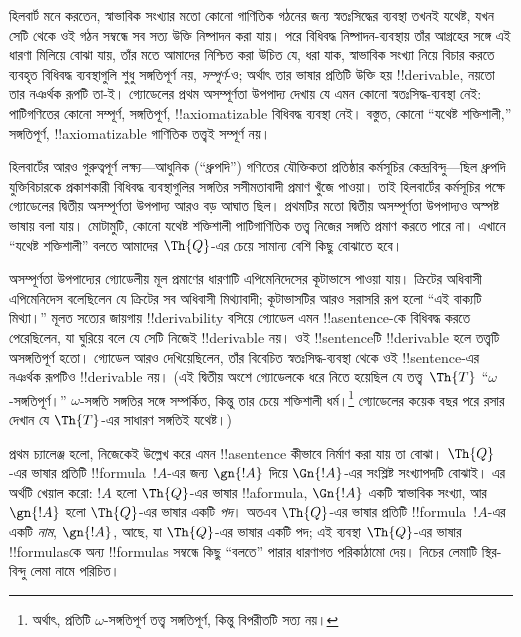 \documentclass[../../../include/open-logic-section]{subfiles}
\begin{document}


হিলবার্ট মনে করতেন, স্বাভাবিক সংখ্যার মতো কোনো গাণিতিক গঠনের জন্য
স্বতঃসিদ্ধের ব্যবস্থা তখনই যথেষ্ট, যখন সেটি থেকে ওই গঠন সম্বন্ধে সব সত্য
উক্তি নিষ্পাদন করা যায়। পরে বিধিবদ্ধ নিষ্পাদন-ব্যবস্থায় তাঁর আগ্রহের
সঙ্গে এই ধারণা মিলিয়ে বোঝা যায়, তাঁর মতে আমাদের নিশ্চিত করা উচিত যে,
ধরা যাক, স্বাভাবিক সংখ্যা নিয়ে বিচার করতে ব্যবহৃত বিধিবদ্ধ ব্যবস্থাগুলি
শুধু সঙ্গতিপূর্ণ নয়, \emph{সম্পূর্ণ}-ও; অর্থাৎ তার ভাষার প্রতিটি উক্তি
হয় !!{derivable}, নয়তো তার নঞর্থক রূপটি তা-ই। গ্যোডেলের প্রথম
অসম্পূর্ণতা উপপাদ্য দেখায় যে এমন কোনো স্বতঃসিদ্ধ-ব্যবস্থা নেই: পাটিগণিতের
কোনো সম্পূর্ণ, সঙ্গতিপূর্ণ, !!{axiomatizable} বিধিবদ্ধ ব্যবস্থা নেই। বস্তুত,
কোনো ``যথেষ্ট শক্তিশালী,'' সঙ্গতিপূর্ণ, !!{axiomatizable} গাণিতিক তত্ত্বই
সম্পূর্ণ নয়।

হিলবার্টের আরও গুরুত্বপূর্ণ লক্ষ্য—আধুনিক (``ধ্রুপদি'') গণিতের যৌক্তিকতা
প্রতিষ্ঠার কর্মসূচির কেন্দ্রবিন্দু—ছিল ধ্রুপদি যুক্তিবিচারকে প্রকাশকারী
বিধিবদ্ধ ব্যবস্থাগুলির সঙ্গতির সসীমতাবাদী প্রমাণ খুঁজে পাওয়া। তাই
হিলবার্টের কর্মসূচির পক্ষে গ্যোডেলের দ্বিতীয় অসম্পূর্ণতা উপপাদ্য আরও বড়
আঘাত ছিল। প্রথমটির মতো দ্বিতীয় অসম্পূর্ণতা উপপাদ্যও অস্পষ্ট ভাষায় বলা
যায়। মোটামুটি, কোনো যথেষ্ট শক্তিশালী পাটিগাণিতিক তত্ত্ব নিজের সঙ্গতি
প্রমাণ করতে পারে না। এখানে ``যথেষ্ট শক্তিশালী'' বলতে আমাদের
$\Th{Q}$-এর চেয়ে সামান্য বেশি কিছু বোঝাতে হবে।

অসম্পূর্ণতা উপপাদ্যের গ্যোডেলীয় মূল প্রমাণের ধারণাটি এপিমেনিদেসের
কূটাভাসে পাওয়া যায়। ক্রিটের অধিবাসী এপিমেনিদেস বলেছিলেন যে ক্রিটের সব
অধিবাসী মিথ্যাবাদী; কূটাভাসটির আরও সরাসরি রূপ হলো ``এই বাক্যটি মিথ্যা।''
মূলত সত্যের জায়গায় !!{derivability} বসিয়ে গ্যোডেল এমন !!a{sentence}-কে
বিধিবদ্ধ করতে পেরেছিলেন, যা ঘুরিয়ে বলে যে সেটি নিজেই !!{derivable} নয়।
ওই !!{sentence}টি !!{derivable} হলে তত্ত্বটি অসঙ্গতিপূর্ণ হতো। গ্যোডেল আরও
দেখিয়েছিলেন, তাঁর বিবেচিত স্বতঃসিদ্ধ-ব্যবস্থা থেকে ওই !!{sentence}-এর
নঞর্থক রূপটিও !!{derivable} নয়। (এই দ্বিতীয় অংশে গ্যোডেলকে ধরে নিতে
হয়েছিল যে তত্ত্ব~$\Th{T}$ ``$\omega$-সঙ্গতিপূর্ণ।'' $\omega$-সঙ্গতি
সঙ্গতির সঙ্গে সম্পর্কিত, কিন্তু তার চেয়ে শক্তিশালী ধর্ম।\footnote{অর্থাৎ,
প্রতিটি $\omega$-সঙ্গতিপূর্ণ তত্ত্ব সঙ্গতিপূর্ণ, কিন্তু বিপরীতটি সত্য নয়।}
গ্যোডেলের কয়েক বছর পরে রসার দেখান যে $\Th{T}$-এর সাধারণ সঙ্গতিই যথেষ্ট।)

প্রথম চ্যালেঞ্জ হলো, নিজেকেই উল্লেখ করে এমন !!a{sentence} কীভাবে নির্মাণ
করা যায় তা বোঝা। $\Th{Q}$-এর ভাষার প্রতিটি !!{formula}~$!A$-এর জন্য
$\gn{!A}$ দিয়ে $\Gn{!A}$-এর সংশ্লিষ্ট সংখ্যাপদটি বোঝাই। এর অর্থটি খেয়াল
করো: $!A$ হলো $\Th{Q}$-এর ভাষার !!a{formula}, $\Gn{!A}$ একটি স্বাভাবিক
সংখ্যা, আর $\gn{!A}$ হলো $\Th{Q}$-এর ভাষার একটি \emph{পদ}। অতএব
$\Th{Q}$-এর ভাষার প্রতিটি !!{formula}~$!A$-এর একটি \emph{নাম},
$\gn{!A}$, আছে, যা $\Th{Q}$-এর ভাষার একটি পদ; এই ব্যবস্থা $\Th{Q}$-এর
ভাষার !!{formula}sকে অন্য !!{formula}s সম্বন্ধে কিছু ``বলতে'' পারার
ধারণাগত পরিকাঠামো দেয়। নিচের লেমাটি স্থির-বিন্দু লেমা নামে পরিচিত।
\end{document}
